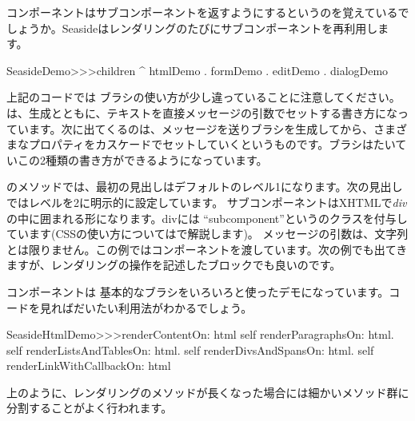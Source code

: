 \documentclass[a4paper,10pt,twoside]{book}
\begin{document}
\noindent
コンポーネントはサブコンポーネントを返すようにするというのを覚えているでしょうか。Seasideはレンダリングのたびにサブコンポーネントを再利用します。
\begin{code}{}
SeasideDemo>>>children
	^ { htmlDemo . formDemo . editDemo . dialogDemo }
\end{code}

上記のコードでは  ブラシの使い方が少し違っていることに注意してください。は、生成とともに、テキストを直接メッセージの引数でセットする書き方になっています。次に出てくるのは、メッセージを送りブラシを生成してから、さまざまなプロパティをカスケードでセットしていくというものです。ブラシはたいていこの2種類の書き方ができるようになっています。


のメソッドでは、最初の見出しはデフォルトのレベル1になります。次の見出しではレベルを2に明示的に設定しています。
 サブコンポーネントはXHTMLで\emph{div}の中に囲まれる形になります。divには ``subcomponent''というのクラスを付与しています(CSSの使い方についてはで解説します)。   メッセージの引数は、文字列とは限りません。この例ではコンポーネントを渡しています。次の例でも出てきますが、レンダリングの操作を記述したブロックでも良いのです。

コンポーネントは 基本的なブラシをいろいろと使ったデモになっています。コードを見ればだいたい利用法がわかるでしょう。

\begin{code}{}
SeasideHtmlDemo>>>renderContentOn: html 
	self renderParagraphsOn: html.
	self renderListsAndTablesOn: html.
	self renderDivsAndSpansOn: html.
	self renderLinkWithCallbackOn: html
\end{code}

上のように、レンダリングのメソッドが長くなった場合には細かいメソッド群に分割することがよく行われます。

\end{document}
